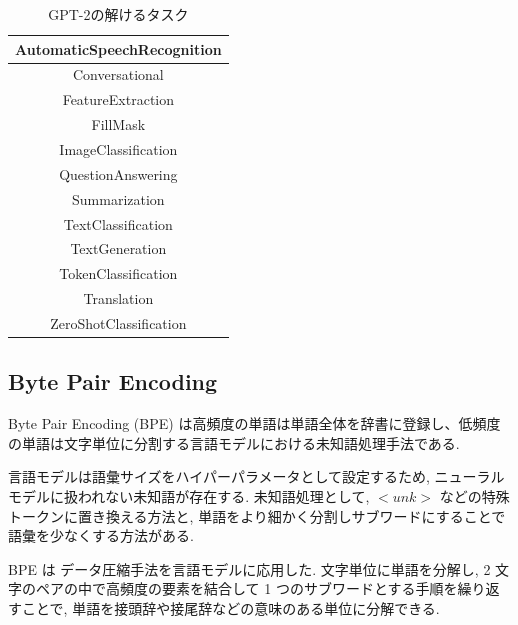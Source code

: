 \documentclass[twocolumn]{jarticle}     %
\begin{document}
\begin{table}[tbh]
  \begin{center}
    \caption{GPT-2の解けるタスク}
    \begin{tabular}{|c|} \hline
      AutomaticSpeechRecognition \\ \hline
      Conversational \\ \hline
      FeatureExtraction \\ \hline
      FillMask \\ \hline
      ImageClassification \\ \hline
      QuestionAnswering \\ \hline
      Summarization \\ \hline
      TextClassification \\ \hline
      TextGeneration \\ \hline
      TokenClassification \\ \hline
      Translation \\ \hline
      ZeroShotClassification \\ \hline
    \end{tabular}
    \label{tab:task}
  \end{center}
\end{table}

\subsection{Byte Pair Encoding}
Byte Pair Encoding (BPE) は高頻度の単語は単語全体を辞書に登録し、低頻度の単語は文字単位に分割する言語モデルにおける未知語処理手法である.

言語モデルは語彙サイズをハイパーパラメータとして設定するため, ニューラルモデルに扱われない未知語が存在する.
未知語処理として, $<unk>$ などの特殊トークンに置き換える方法と, 単語をより細かく分割しサブワードにすることで語彙を少なくする方法がある.

BPE は
データ圧縮手法を言語モデルに応用した.
文字単位に単語を分解し, 2 文字のペアの中で高頻度の要素を結合して 1 つのサブワードとする手順を繰り返すことで,
単語を接頭辞や接尾辞などの意味のある単位に分解できる.


%
\end{document}
